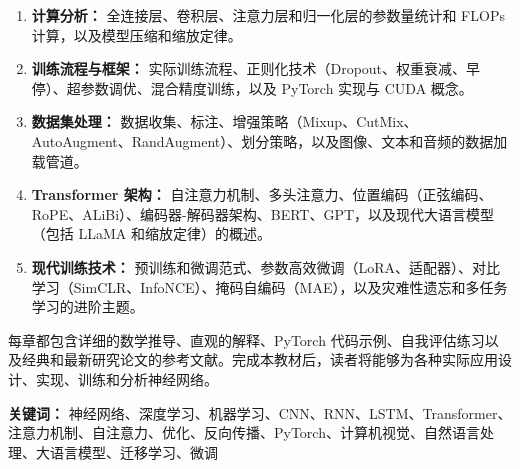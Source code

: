 \begin{enumerate}
    \item \textbf{计算分析：} 全连接层、卷积层、注意力层和归一化层的参数量统计和 FLOPs 计算，以及模型压缩和缩放定律。

    \item \textbf{训练流程与框架：} 实际训练流程、正则化技术（Dropout、权重衰减、早停）、超参数调优、混合精度训练，以及 PyTorch 实现与 CUDA 概念。

    \item \textbf{数据集处理：} 数据收集、标注、增强策略（Mixup、CutMix、AutoAugment、RandAugment）、划分策略，以及图像、文本和音频的数据加载管道。

    \item \textbf{Transformer 架构：} 自注意力机制、多头注意力、位置编码（正弦编码、RoPE、ALiBi）、编码器-解码器架构、BERT、GPT，以及现代大语言模型（包括 LLaMA 和缩放定律）的概述。

    \item \textbf{现代训练技术：} 预训练和微调范式、参数高效微调（LoRA、适配器）、对比学习（SimCLR、InfoNCE）、掩码自编码（MAE），以及灾难性遗忘和多任务学习的进阶主题。
\end{enumerate}

每章都包含详细的数学推导、直观的解释、PyTorch 代码示例、自我评估练习以及经典和最新研究论文的参考文献。完成本教材后，读者将能够为各种实际应用设计、实现、训练和分析神经网络。

\vspace{2cm}

\textbf{关键词：} 神经网络、深度学习、机器学习、CNN、RNN、LSTM、Transformer、注意力机制、自注意力、优化、反向传播、PyTorch、计算机视觉、自然语言处理、大语言模型、迁移学习、微调

\newpage

